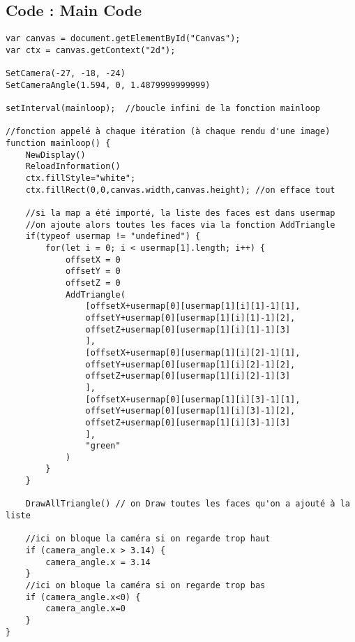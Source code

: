 \subsection{Code : Main Code}
\begin{verbatim}
var canvas = document.getElementById("Canvas");
var ctx = canvas.getContext("2d");

SetCamera(-27, -18, -24)
SetCameraAngle(1.594, 0, 1.4879999999999)

setInterval(mainloop);  //boucle infini de la fonction mainloop

//fonction appelé à chaque itération (à chaque rendu d'une image)
function mainloop() {
    NewDisplay()
    ReloadInformation()
    ctx.fillStyle="white";
    ctx.fillRect(0,0,canvas.width,canvas.height); //on efface tout

    //si la map a été importé, la liste des faces est dans usermap
    //on ajoute alors toutes les faces via la fonction AddTriangle
    if(typeof usermap != "undefined") {
        for(let i = 0; i < usermap[1].length; i++) {
            offsetX = 0
            offsetY = 0
            offsetZ = 0
            AddTriangle(
                [offsetX+usermap[0][usermap[1][i][1]-1][1],
                offsetY+usermap[0][usermap[1][i][1]-1][2],
                offsetZ+usermap[0][usermap[1][i][1]-1][3]
                ],
                [offsetX+usermap[0][usermap[1][i][2]-1][1],
                offsetY+usermap[0][usermap[1][i][2]-1][2],
                offsetZ+usermap[0][usermap[1][i][2]-1][3]
                ],
                [offsetX+usermap[0][usermap[1][i][3]-1][1],
                offsetY+usermap[0][usermap[1][i][3]-1][2],
                offsetZ+usermap[0][usermap[1][i][3]-1][3]
                ],
                "green"
            )
        }
    }
    
    DrawAllTriangle() // on Draw toutes les faces qu'on a ajouté à la liste

    //ici on bloque la caméra si on regarde trop haut
    if (camera_angle.x > 3.14) {
        camera_angle.x = 3.14
    }
    //ici on bloque la caméra si on regarde trop bas
    if (camera_angle.x<0) {
        camera_angle.x=0
    }
}
\end{verbatim}